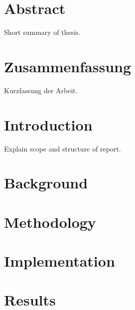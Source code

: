 \documentclass[11pt,a4paper]{book}
\begin{document}
\frontmatter


\chapter*{Abstract}
Short summary of thesis.

\chapter*{Zusammenfassung}
Kurzfassung der Arbeit.

\tableofcontents

\mainmatter
\chapter{Introduction}
\label{s:Introduction}
Explain scope and structure of report.


\chapter{Background}
\label{s:Background}


\chapter{Methodology}
\label{s:Methodology}


\chapter{Implementation}
\label{s:Implementation}


\chapter{Results}
\label{s:Results}

\end{document}
